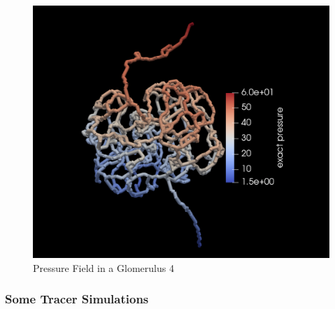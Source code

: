 \begin{figure}[h]
\centering
\includegraphics[width=162mm]{glom4_pressure}
\caption{Pressure Field in a Glomerulus 4}
\label{fig:glom4_pressure}
\end{figure}


\subsubsection*{Some Tracer Simulations}
\label{Tracer}

